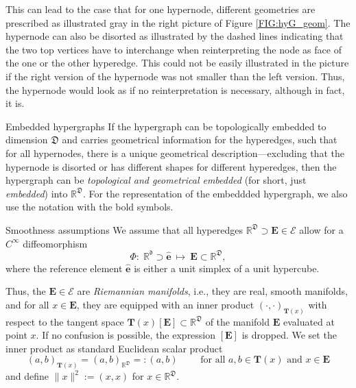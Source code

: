 \documentclass[a4paper, english, 12pt, reqno, draft]{amsart}
\makeatletter
\theoremstyle{definition}
\theoremstyle{remark}
\numberwithin{equation}{section}
\newcommand{\setEdge}{\ensuremath{\mathcal E}}
\newcommand{\SetEdge}{\ensuremath{\boldsymbol{\mathcal E}}}
\newcommand{\Edge}{{\ensuremath{\boldsymbol E}}}
\newcommand{\RefEdge}{{\ensuremath{\widehat{\boldsymbol e}}}}
\newcommand{\locDim}{\ensuremath{\mathfrak d}}
\newcommand{\globDim}{\ensuremath{\mathfrak D}}
\newcommand{\tangent}{\ensuremath{{\boldsymbol T}}}
\newcommand{\diffeo}{\ensuremath{\Phi}}
\newcommand{\IR}{\ensuremath{\mathbb R}}
\def\paragraph{\@startsection{paragraph}{4}%
  \z@\z@{-\fontdimen2\font}%
  {\normalfont\scshape}}
\makeatother
\begin{document}
This can lead to the case that for one hypernode, different geometries are prescribed as illustrated gray in the right picture of Figure \ref{FIG:hyG_geom}. The hypernode can also be disorted as illustrated by the dashed lines indicating that the two top vertices have to interchange when reinterpreting the node as face of the one or the other hyperedge. This could not be easily illustrated in the picture if the right version of the hypernode was not smaller than the left version. Thus, the hypernode would look as if no reinterpretation is necessary, although in fact, it is.

\paragraph{Embedded hypergraphs}
% 
If the hypergraph can be topologically embedded to dimension $\globDim$ and carries geometrical information for the hyperedges, such that for all hypernodes, there is a unique geometrical description---excluding that the hypernode is disorted or has different shapes for different hyperedges, then the hypergraph can be \emph{topological and geometrical embedded} (for short, just \emph{embedded}) into $\IR^\globDim$. For the representation of the embeddded hypergraph, we also use the notation with the bold symbols.

\paragraph{Smoothness assumptions}
% 
We assume that all hyperedges $\IR^\globDim \supset \Edge \in \SetEdge$ allow for a $C^\infty$ diffeomorphism
% 
\begin{equation*}
 \diffeo \colon \; \IR^\locDim \supset \RefEdge ~\mapsto~ \Edge \subset \IR^\globDim,
\end{equation*}
% 
where the reference element $\RefEdge$ is either a unit simplex of a unit hypercube.

Thus, the $\Edge\in \setEdge$ are \emph{Riemannian manifolds}, i.e., they are real, smooth manifolds, and for all $x \in \Edge$, they are equipped with an inner product $(\cdot,\cdot)_{\tangent(x)}$ with respect to the tangent space $\tangent(x)[\Edge] \subset \IR^\globDim$ of the manifold $\Edge$ evaluated at point $x$. If no confusion is possible, the expression $[\Edge]$ is dropped. We set the inner product as standard Euclidean scalar product
% 
\begin{equation*}
 (a,b)_{\tangent(x)} = (a,b)_{\IR^\globDim} =: (a,b) \qquad \text{ for all } a,b \in \tangent(x) \text{ and } x \in \Edge
\end{equation*}
% 
and define $\| x \|^2 := (x,x)$ for $x \in \IR^\globDim$.
\end{document}
